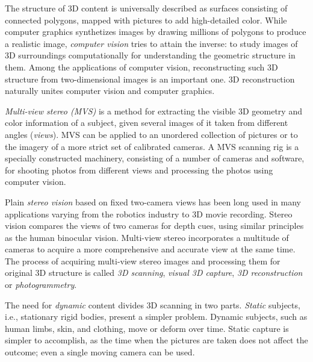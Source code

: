 The structure of 3D content is universally described as surfaces consisting of connected polygons, mapped with pictures to add high-detailed color.
While computer graphics synthetizes images by drawing millions of polygons to produce a realistic image, \emph{computer vision} tries to attain the inverse:
to study images of 3D surroundings computationally for understanding the geometric structure in them.
Among the applications of computer vision, reconstructing such 3D structure from two-dimensional images is an important one.
3D reconstruction naturally unites computer vision and computer graphics.


\emph{Multi-view stereo (MVS)} is a method for extracting the visible 3D geometry and color information of a subject, given several images of it taken from different angles (\emph{views}).
MVS can be applied to an unordered collection of pictures or to the imagery of a more strict set of calibrated cameras.
A MVS scanning rig is a specially constructed machinery, consisting of a number of cameras and software, for shooting photos from different views and processing the photos using computer vision.


Plain \emph{stereo vision} based on fixed two-camera views has been long used in many applications varying from the robotics industry to 3D movie recording.
Stereo vision compares the views of two cameras for depth cues, using similar principles as the human binocular vision.
Multi-view stereo incorporates a multitude of cameras to acquire a more comprehensive and accurate view at the same time.
The process of acquiring multi-view stereo images and processing them for original 3D structure is called \emph{3D scanning}, \emph{visual 3D capture}, \emph{3D reconstruction} or \emph{photogrammetry}.


The need for \emph{dynamic} content divides 3D scanning in two parts.
\emph{Static} subjects, i.e., stationary rigid bodies, present a simpler problem.
Dynamic subjects, such as human limbs, skin, and clothing, move or deform over time.
Static capture is simpler to accomplish, as the time when the pictures are taken does not affect the outcome; even a single moving camera can be used.


